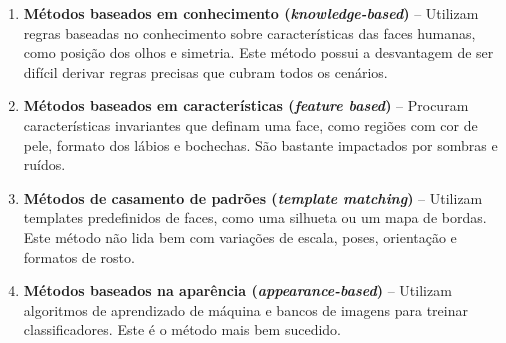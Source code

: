 \begin{enumerate}
\item \textbf{Métodos baseados em conhecimento (\textit{knowledge-based})} -- Utilizam regras baseadas no conhecimento sobre características das faces humanas, como posição dos olhos e simetria. Este método possui a desvantagem de ser difícil derivar regras precisas que cubram todos os cenários.

\item \textbf{Métodos baseados em características (\textit{feature based})} -- Procuram características invariantes que definam uma face, como regiões com cor de pele, formato dos lábios e bochechas. São bastante impactados por sombras e ruídos.

\item \textbf{Métodos de casamento de padrões (\textit{template matching})} -- Utilizam templates predefinidos de faces, como uma silhueta ou um mapa de bordas. Este método não lida bem com variações de escala, poses, orientação e formatos de rosto.

\item \textbf{Métodos baseados na aparência (\textit{appearance-based})} -- Utilizam algoritmos de aprendizado de máquina e bancos de imagens para treinar classificadores. Este é o método mais bem sucedido.

\end{enumerate}


